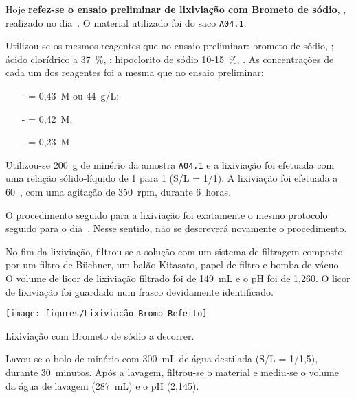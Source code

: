 \hrulefill

\label{day:10-janeiro-2025}

Hoje \textbf{refez-se o ensaio preliminar de lixiviação com Brometo de sódio}, \bromo{}, realizado no dia~.
O material utilizado foi do saco \texttt{A04.1}.

Utilizou-se os mesmos reagentes que no ensaio preliminar: brometo de sódio, \bromo{}; ácido clorídrico a 37~\%, \acl{}; hipoclorito de sódio 10-15~\%, \hipso{}.
As concentrações de cada um dos reagentes foi a mesma que no ensaio preliminar:

\begin{itemize}
	\item[-] \bromo{} = 0,43~M ou 44~g/L;
	\item[-] \acl{} = 0,42~M;
	\item[-] \hipso{} = 0,23~M.
\end{itemize}

Utilizou-se 200~g de minério da amostra \texttt{A04.1} e a lixiviação foi efetuada com uma relação sólido-líquido de 1 para 1 (S/L = 1/1).
A lixiviação foi efetuada a 60~\graus{}, com uma agitação de 350~rpm, durante 6~horas.


O procedimento seguido para a lixiviação foi exatamente o mesmo protocolo seguido para o dia~.
Nesse sentido, não se descreverá novamente o procedimento.

No fim da lixiviação, filtrou-se a solução com um sistema de filtragem composto por um filtro de Büchner, um balão Kitasato, papel de filtro e bomba de vácuo.
O volume de licor de lixiviação filtrado foi de 149~mL e o pH foi de 1,260.
O licor de lixiviação foi guardado num frasco devidamente identificado.

\begin{marginfigure}[\baselineskip]
	\centering
	\texttt{[image: figures/Lixiviação Bromo Refeito]}
	\caption{Lixiviação com Brometo de sódio a decorrer.}
	\label{fig:lix-bromo2}
\end{marginfigure}

Lavou-se o bolo de minério com 300~mL de água destilada (S/L = 1/1,5), durante 30~minutos.
Após a lavagem, filtrou-se o material e mediu-se o volume da água de lavagem (287~mL) e o pH (2,145).

